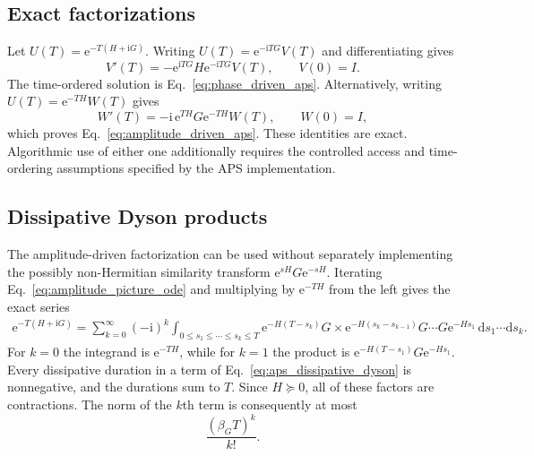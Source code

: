\documentclass[aps,pra,reprint,floatfix,unsortedaddress,superscriptaddress]{revtex4-2}
\begin{document}
\subsection{Exact factorizations}

Let
$U(T)=\mathrm e^{-T(H+\mathrm iG)}$.
Writing $U(T)=\mathrm e^{-\mathrm iTG}V(T)$ and differentiating gives
\begin{equation}
    V'(T)
    =
    -\mathrm e^{\mathrm iTG}
    H
    \mathrm e^{-\mathrm iTG}V(T),
    \qquad V(0)=I.
    \label{eq:phase_picture_ode}
\end{equation}
The time-ordered solution is
Eq.~\eqref{eq:phase_driven_aps}.
Alternatively, writing
$U(T)=\mathrm e^{-T H}W(T)$ gives
\begin{equation}
    W'(T)
    =
    -\mathrm i\,
    \mathrm e^{T H}
    G
    \mathrm e^{-T H}W(T),
    \qquad W(0)=I,
    \label{eq:amplitude_picture_ode}
\end{equation}
which proves Eq.~\eqref{eq:amplitude_driven_aps}.  These identities are
exact.  Algorithmic use of either one additionally requires the
controlled access and time-ordering assumptions specified by the APS
implementation.

\subsection{Dissipative Dyson products}

The amplitude-driven factorization can be used without separately
implementing the possibly non-Hermitian similarity transform
$\mathrm e^{sH}G\mathrm e^{-sH}$.  Iterating
Eq.~\eqref{eq:amplitude_picture_ode} and multiplying by
$\mathrm e^{-TH}$ from the left gives the exact series
\begin{align}
\mathrm e^{-T(H+\mathrm iG)}
=\sum_{k=0}^{\infty}(-\mathrm i)^k
\int_{0\leq s_1\leq\cdots\leq s_k\leq T}
\mathrm e^{-H(T-s_k)}G
\times
\mathrm e^{-H(s_k-s_{k-1})}G\cdots
G\mathrm e^{-Hs_1}\,
\mathrm ds_1\cdots\mathrm ds_k .
\label{eq:aps_dissipative_dyson}
\end{align}
For $k=0$ the integrand is $\mathrm e^{-TH}$, while for $k=1$ the
product is
$\mathrm e^{-H(T-s_1)}G\mathrm e^{-Hs_1}$.  Every dissipative
duration in a term of Eq.~\eqref{eq:aps_dissipative_dyson} is
nonnegative, and the durations sum to $T$.  Since
$H\succeq0$, all of these factors are contractions.  The norm of the
$k$th term is consequently at most
\begin{equation}
    \frac{(\beta_GT)^k}{k!}.
    \label{eq:aps_dyson_term_bound}
\end{equation}
\end{document}
